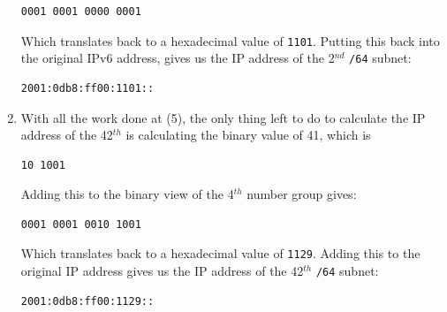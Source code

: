 \documentclass[12pt]{article}
\begin{document}
\begin{enumerate}
        \begin{verbatim}0001 0001 0000 0001\end{verbatim}
        Which translates back to a hexadecimal value of \verb|1101|. Putting
        this back into the original IPv6 address, gives us the IP address of
        the 2$^{nd}$ \verb|/64| subnet:
        \begin{verbatim}2001:0db8:ff00:1101::\end{verbatim}
    \item With all the work done at (5), the only thing left to do to calculate
        the IP address of the 42$^{th}$ is calculating the binary value of 41,
        which is
        \begin{verbatim}10 1001\end{verbatim}
        Adding this to the binary view of the 4$^{th}$ number group gives:
        \begin{verbatim}0001 0001 0010 1001\end{verbatim}
        Which translates back to a hexadecimal value of \verb|1129|. Adding
        this to the original IP address gives us the IP address of the 42$^{th}$
        \verb|/64| subnet:
        \begin{verbatim}2001:0db8:ff00:1129::\end{verbatim}
\end{enumerate}
\clearpage
\end{document}
